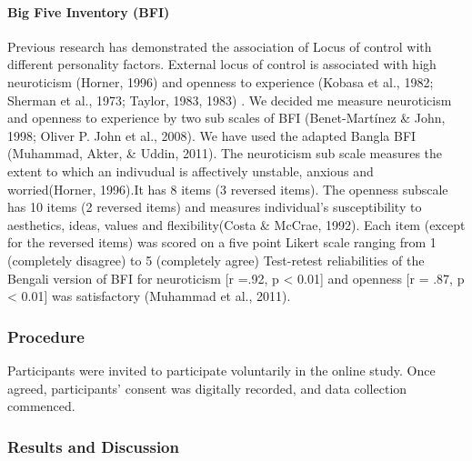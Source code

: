 \documentclass[
  english,
  man]{apa6}
\let\oldparagraph\paragraph
\renewcommand{\paragraph}[1]{\oldparagraph{#1}\mbox{}}
\begin{document}
\hypertarget{big-five-inventory-bfi}{%
\paragraph{Big Five Inventory (BFI)}\label{big-five-inventory-bfi}}

Previous research has demonstrated the association of Locus of control with different personality factors. External locus of control is associated with high neuroticism (Horner, 1996) and openness to experience (Kobasa et al., 1982; Sherman et al., 1973; Taylor, 1983, 1983) . We decided me measure neuroticism and openness to experience by two sub scales of BFI (Benet-Martínez \& John, 1998; Oliver P. John et al., 2008). We have used the adapted Bangla BFI (Muhammad, Akter, \& Uddin, 2011). The neuroticism sub scale measures the extent to which an indivudual is affectively unstable, anxious and worried(Horner, 1996).It has 8 items (3 reversed items). The openness subscale has 10 items (2 reversed items) and measures individual's susceptibility to aesthetics, ideas, values and flexibility(Costa \& McCrae, 1992). Each item (except for the reversed items) was scored on a five point Likert scale ranging from 1 (completely disagree) to 5 (completely agree) Test-retest reliabilities of the Bengali version of BFI for neuroticism {[}r =.92, p \textless{} 0.01{]} and openness {[}r = .87, p \textless{} 0.01{]} was satisfactory (Muhammad et al., 2011).

\hypertarget{procedure-1}{%
\subsubsection{Procedure}\label{procedure-1}}

Participants were invited to participate voluntarily in the online study. Once agreed, participants' consent was digitally recorded, and data collection commenced.

\hypertarget{results-and-discussion}{%
\subsubsection{Results and Discussion}\label{results-and-discussion}}
\end{document}
